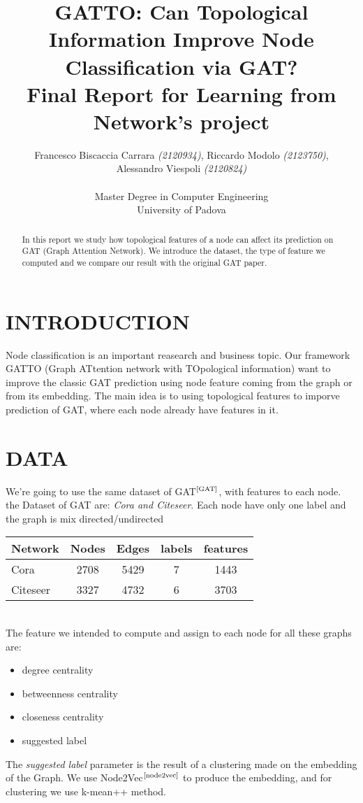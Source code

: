 \documentclass[12pt,conference]{ieeeconf} %
\title{GATTO: Can Topological Information Improve Node Classification via GAT?\\
\large Final Report for Learning from Network's project \\}
\author{Francesco Biscaccia Carrara \textit{(2120934)}, Riccardo Modolo \textit{(2123750)},\\ Alessandro Viespoli \textit{(2120824)} %
\\\\ Master Degree in Computer Engineering \\
University of Padova \\
}
\begin{document}
\maketitle
\thispagestyle{plain}
\pagestyle{plain}

\begin{abstract}
    In this report we study how topological features of a node can affect its prediction on GAT (Graph Attention Network).
We introduce the dataset, the type of feature we computed and we compare our result with the 
original GAT paper.
    
\end{abstract}


\section{INTRODUCTION} 
Node classification is an important reasearch and business topic.
Our framework GATTO (Graph ATtention network with TOpological information) want to 
improve the classic GAT prediction using node feature coming from the graph or from its 
embedding. The main idea is to using topological features to imporve prediction of GAT, where each node already have features in it. 

\section{DATA} 
We're going to use the same dataset of GAT$^\text{\cite{GAT}}$, with features to each node.
the Dataset of GAT are: \textit{Cora and Citeseer}. Each node have only one label and the graph is mix directed/undirected
\\
\begin{table}[h!]
    \centering
    \renewcommand{\arraystretch}{1.5}
    \begin{tabular}{|l|c|c|c|c|}
    \hline
    \textbf{Network} & \textbf{Nodes} & \textbf{Edges} & \textbf{labels} & \textbf{features} \\
    \hline
    Cora           & 2708 & 5429  & 7  & 1443  \\
    Citeseer       & 3327 & 4732  & 6  & 3703  \\
    \hline
    \end{tabular}
\end{table}
\\
The feature we intended to compute and assign to each node for all these graphs are:
\begin{itemize}
    \item degree centrality
    \item betweenness centrality
    \item closeness centrality
    \item suggested label
\end{itemize}
The \textit{suggested label} parameter is the result of a clustering made on the embedding of the Graph.
We use Node2Vec$^\text{\cite{node2vec}}$ to produce the embedding, and for clustering we use k-mean++ method.
\end{document}
